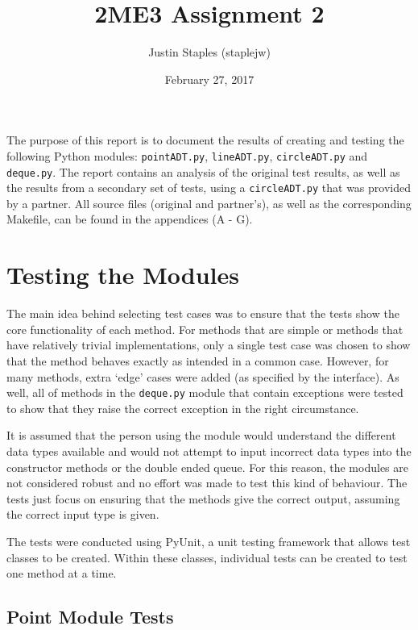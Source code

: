 \documentclass[12pt]{article}
\title{2ME3 Assignment 2}
\author{Justin Staples (staplejw)}
\date{February 27, 2017}
\begin{document}
\maketitle
\thispagestyle{empty}

\newpage

\tableofcontents

\thispagestyle{empty}

\newpage

\setcounter{page}{1}

The purpose of this report is to document the results of creating and testing the following Python modules: {\tt pointADT.py}, {\tt lineADT.py}, {\tt circleADT.py} and {\tt deque.py}. The report contains an analysis of the original test results, as well as the results from a secondary set of tests, using a {\tt circleADT.py} that was provided by a partner. All source files (original and partner's), as well as the corresponding Makefile, can be found in the appendices (A - G).

\section{Testing the Modules}

The main idea behind selecting test cases was to ensure that the tests show the core functionality of each method. For methods that are simple or methods that have relatively trivial implementations, only a single test case was chosen to show that the method behaves exactly as intended in a common case. However, for many methods, extra `edge' cases were added (as specified by the interface). As well, all of methods in the {\tt deque.py} module that contain exceptions were tested to show that they raise the correct exception in the right circumstance.

It is assumed that the person using the module would understand the different data types available and would not attempt to input incorrect data types into the constructor methods or the double ended queue. For this reason, the modules are not considered robust and no effort was made to test this kind of behaviour. The tests just focus on ensuring that the methods give the correct output, assuming the correct input type is given. 

The tests were conducted using PyUnit, a unit testing framework that allows test classes to be created. Within these classes, individual tests can be created to test one method at a time. 

\subsection{Point Module Tests}
\end{document}
